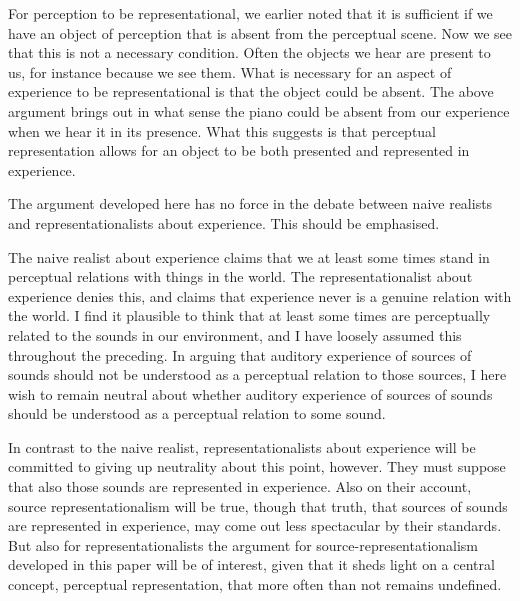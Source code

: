 \documentclass[sloppy, journal, git, bytitle, dodraft]{humapap}
\begin{document}
For perception to be representational, we earlier noted that it is sufficient if we have an object of perception that is absent from the perceptual scene. Now we see that this is not a necessary condition. Often the objects we hear are present to us, for instance because we see them. What is necessary for an aspect of experience to be representational is that the object could be absent. The above argument brings out in what sense the piano could be absent from our experience when we hear it in its presence. What this suggests is that perceptual representation allows for an object to be both presented and represented in experience. 

The argument developed here has no force in the debate between naive realists and representationalists about experience. This should be emphasised. 

The naive realist about experience claims that we at least some times stand in perceptual relations with things in the world. The representationalist about experience denies this, and claims that experience never is a genuine relation with the world. I find it plausible to think that at least some times are perceptually related to the sounds in our environment, and I have loosely assumed this throughout the preceding. In arguing that auditory experience of sources of sounds should not be understood as a perceptual relation to those sources, I here wish to remain neutral about whether auditory experience of sources of sounds should be understood as a perceptual relation to some sound. 

In contrast to the naive realist, representationalists about experience will be committed to giving up neutrality about this point, however. They must suppose that also those sounds are represented in experience. Also on their account, source representationalism will be true, though that truth, that sources of sounds are represented in experience, may come out less spectacular by their standards. But also for representationalists the argument for source-representationalism developed in this paper will be of interest, given that it sheds light on a central concept, perceptual representation, that more often than not remains undefined. 


\end{document}
